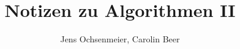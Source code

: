 \documentclass[ngerman,red]{latex-classes/prose}
\title{Notizen zu Algorithmen II}
\author{Jens Ochsenmeier, Carolin Beer}
\begin{document}
  \maketitle

  \tableofcontents

  
  
  
  
  
  
  
  
  
  
  
  
  
  
  

  \begin{appendices}
    
    

% 


  \end{appendices}


  \printindex
  
\end{document}

